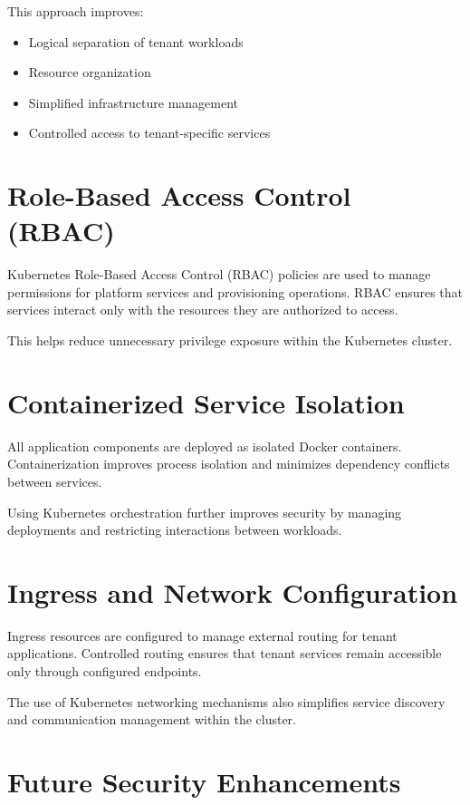 \documentclass[12pt,a4paper]{report}
\begin{document}
This approach improves:

\begin{itemize}

    \item Logical separation of tenant workloads
    \item Resource organization
    \item Simplified infrastructure management
    \item Controlled access to tenant-specific services

\end{itemize}

\section{Role-Based Access Control (RBAC)}

Kubernetes Role-Based Access Control (RBAC) policies are used to manage permissions for platform services and provisioning operations. RBAC ensures that services interact only with the resources they are authorized to access.

This helps reduce unnecessary privilege exposure within the Kubernetes cluster.

\section{Containerized Service Isolation}

All application components are deployed as isolated Docker containers. Containerization improves process isolation and minimizes dependency conflicts between services.

Using Kubernetes orchestration further improves security by managing deployments and restricting interactions between workloads.

\section{Ingress and Network Configuration}

Ingress resources are configured to manage external routing for tenant applications. Controlled routing ensures that tenant services remain accessible only through configured endpoints.

The use of Kubernetes networking mechanisms also simplifies service discovery and communication management within the cluster.

\section{Future Security Enhancements}
\end{document}
